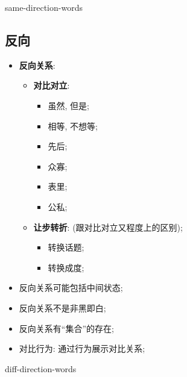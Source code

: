     {same-direction-words}

  \subsection{反向}

    \begin{itemize}
      \item \textbf{反向关系}:
      \begin{itemize}
        \item \textbf{对比对立}:
        \begin{itemize}
          \item 虽然, 但是;
          \item 相等, 不想等;
          \item 先后;
          \item 众寡;
          \item 表里;
          \item 公私;
        \end{itemize}

        \item \textbf{让步转折}: 
        (跟对比对立又程度上的区别);
        \begin{itemize}
          \item 转换话题;
          \item 转换成度;
        \end{itemize}
      \end{itemize}

      \item 反向关系可能包括中间状态;
      \item 反向关系不是非黑即白;
      \item 反向关系有“集合”的存在;
      \item 对比行为: 通过行为展示对比关系;
    \end{itemize}

    {diff-direction-words}
